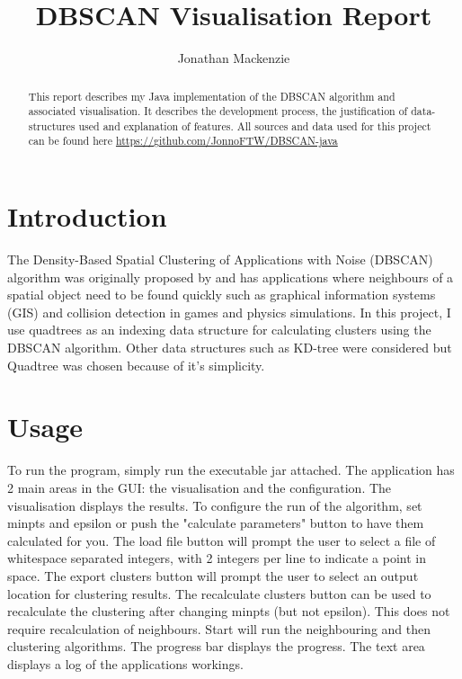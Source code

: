 \documentclass{CRPITStyle}
\renewcommand{\cite}{\citep}
\begin{document}
\title{DBSCAN Visualisation Report}
\author{Jonathan Mackenzie}

\maketitle

\begin{abstract}
This report describes my Java implementation of the DBSCAN algorithm and associated visualisation. It describes the development process, the justification of data-structures used and explanation of features. All sources and data used for this project can be found here \url{https://github.com/JonnoFTW/DBSCAN-java}
\end{abstract}
\vspace{.1in}

\section{Introduction}
The Density-Based Spatial Clustering of Applications with Noise (DBSCAN) algorithm was originally proposed by \cite{Ester96adensity-based} and has applications where neighbours of a spatial object need to be found quickly such as graphical information systems (GIS) and collision detection in games and physics simulations. In this project, I use quadtrees as an indexing data structure for calculating clusters using the DBSCAN algorithm. Other data structures such as KD-tree were considered but Quadtree was chosen because of it's simplicity.

\section{Usage}
To run the program, simply run the executable jar attached. The application has 2 main areas in the GUI: the visualisation and the configuration. The visualisation displays the results. To configure the run of the algorithm, set minpts and epsilon or push the "calculate parameters" button to have them calculated for you. The load file button will prompt the user to select a file of whitespace separated integers, with 2 integers per line to indicate a point in space. The export clusters button will prompt the user to select an output location for clustering results. The recalculate clusters button can be used to recalculate the clustering after changing minpts (but not epsilon). This does not require recalculation of neighbours. Start will run the neighbouring and then clustering algorithms. The progress bar displays the progress. The text area displays a log of the applications workings.
\end{document}
